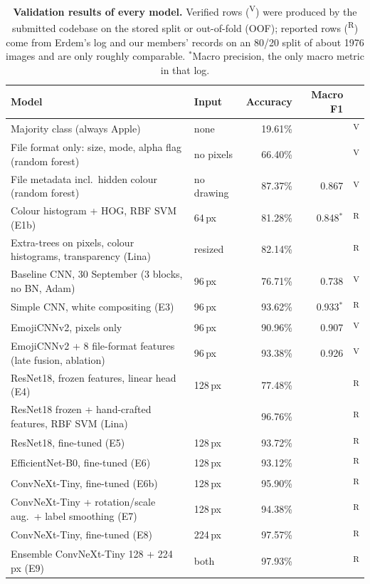 \documentclass[11pt,a4paper]{article}
\newcommand{\ver}{\textsuperscript{\textcolor{verified}{\sffamily\scriptsize V}}}
\newcommand{\rep}{\textsuperscript{\textcolor{reported}{\sffamily\scriptsize R}}}
\begin{document}
\begin{table}[t]
\centering\small
\caption{\textbf{Validation results of every model.} Verified rows (\ver) were produced by the submitted codebase on the stored split or out-of-fold (OOF); reported rows (\rep) come from Erdem's log and our members' records on an 80/20 split of about \num{1976} images and are only roughly comparable. $^\ast$Macro precision, the only macro metric in that log.}
\label{tab:ladder}
\setlength{\tabcolsep}{4.5pt}
\begin{tabular}{@{}llrrc@{}}
\toprule
Model & Input & Accuracy & Macro F1 & \\
\midrule
Majority class (always Apple) & none & 19.61\% & & \ver\\
File format only: size, mode, alpha flag (random forest) & no pixels & 66.40\% & & \ver\\
File metadata incl.\ hidden colour (random forest) & no drawing & 87.37\% & 0.867 & \ver\\
Colour histogram + HOG, RBF SVM (E1b) & 64\,px & 81.28\% & 0.848$^\ast$ & \rep\\
Extra-trees on pixels, colour histograms, transparency (Lina) & resized & 82.14\% & & \rep\\
\midrule
Baseline CNN, 30 September (3 blocks, no BN, Adam) & 96\,px & 76.71\% & 0.738 & \ver\\
Simple CNN, white compositing (E3) & 96\,px & 93.62\% & 0.933$^\ast$ & \rep\\
EmojiCNNv2, pixels only & 96\,px & 90.96\% & 0.907 & \ver\\
EmojiCNNv2 + 8 file-format features (late fusion, ablation) & 96\,px & 93.38\% & 0.926 & \ver\\
\midrule
ResNet18, frozen features, linear head (E4) & 128\,px & 77.48\% & & \rep\\
ResNet18 frozen + hand-crafted features, RBF SVM (Lina) & & 96.76\% & & \rep\\
ResNet18, fine-tuned (E5) & 128\,px & 93.72\% & & \rep\\
EfficientNet-B0, fine-tuned (E6) & 128\,px & 93.12\% & & \rep\\
ConvNeXt-Tiny, fine-tuned (E6b) & 128\,px & 95.90\% & & \rep\\
ConvNeXt-Tiny + rotation/scale aug.\ + label smoothing (E7) & 128\,px & 94.38\% & & \rep\\
ConvNeXt-Tiny, fine-tuned (E8) & 224\,px & 97.57\% & & \rep\\
Ensemble ConvNeXt-Tiny 128 + 224\,px (E9) & both & 97.93\% & & \rep\\

\end{tabular}
\end{table}
\end{document}
